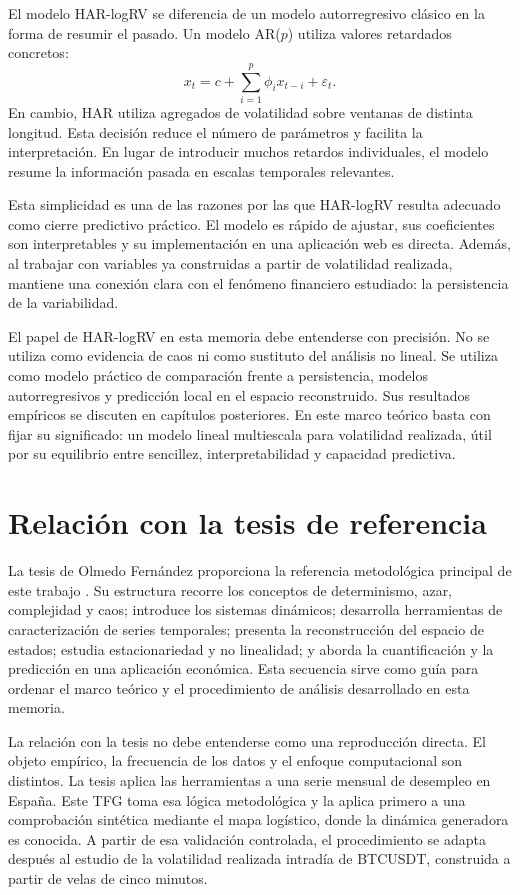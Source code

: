 El modelo HAR-logRV se diferencia de un modelo autorregresivo clásico en la forma de resumir el pasado. Un modelo AR(\(p\)) utiliza valores retardados concretos:
\begin{equation}
    x_t = c+\sum_{i=1}^{p}\phi_i x_{t-i}+\varepsilon_t.
\end{equation}
En cambio, HAR utiliza agregados de volatilidad sobre ventanas de distinta longitud. Esta decisión reduce el número de parámetros y facilita la interpretación. En lugar de introducir muchos retardos individuales, el modelo resume la información pasada en escalas temporales relevantes.

Esta simplicidad es una de las razones por las que HAR-logRV resulta adecuado como cierre predictivo práctico. El modelo es rápido de ajustar, sus coeficientes son interpretables y su implementación en una aplicación web es directa. Además, al trabajar con variables ya construidas a partir de volatilidad realizada, mantiene una conexión clara con el fenómeno financiero estudiado: la persistencia de la variabilidad.

El papel de HAR-logRV en esta memoria debe entenderse con precisión. No se utiliza como evidencia de caos ni como sustituto del análisis no lineal. Se utiliza como modelo práctico de comparación frente a persistencia, modelos autorregresivos y predicción local en el espacio reconstruido. Sus resultados empíricos se discuten en capítulos posteriores. En este marco teórico basta con fijar su significado: un modelo lineal multiescala para volatilidad realizada, útil por su equilibrio entre sencillez, interpretabilidad y capacidad predictiva.

\section{Relación con la tesis de referencia}\label{sec:tesis-referencia}

La tesis de Olmedo Fernández proporciona la referencia metodológica principal de este trabajo \cite{olmedo2001}. Su estructura recorre los conceptos de determinismo, azar, complejidad y caos; introduce los sistemas dinámicos; desarrolla herramientas de caracterización de series temporales; presenta la reconstrucción del espacio de estados; estudia estacionariedad y no linealidad; y aborda la cuantificación y la predicción en una aplicación económica. Esta secuencia sirve como guía para ordenar el marco teórico y el procedimiento de análisis desarrollado en esta memoria.

La relación con la tesis no debe entenderse como una reproducción directa. El objeto empírico, la frecuencia de los datos y el enfoque computacional son distintos. La tesis aplica las herramientas a una serie mensual de desempleo en España. Este TFG toma esa lógica metodológica y la aplica primero a una comprobación sintética mediante el mapa logístico, donde la dinámica generadora es conocida. A partir de esa validación controlada, el procedimiento se adapta después al estudio de la volatilidad realizada intradía de BTCUSDT, construida a partir de velas de cinco minutos.

